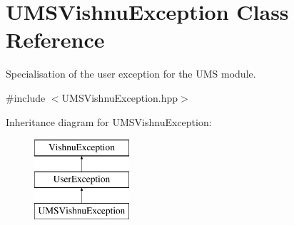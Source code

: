 \hypertarget{classUMSVishnuException}{
\section{UMSVishnuException Class Reference}
\label{classUMSVishnuException}
}


Specialisation of the user exception for the UMS module.  




{\ttfamily \#include $<$UMSVishnuException.hpp$>$}

Inheritance diagram for UMSVishnuException:\begin{figure}[H]
\begin{center}
\leavevmode
\includegraphics[height=3.000000cm]{classUMSVishnuException}
\end{center}
\end{figure}

